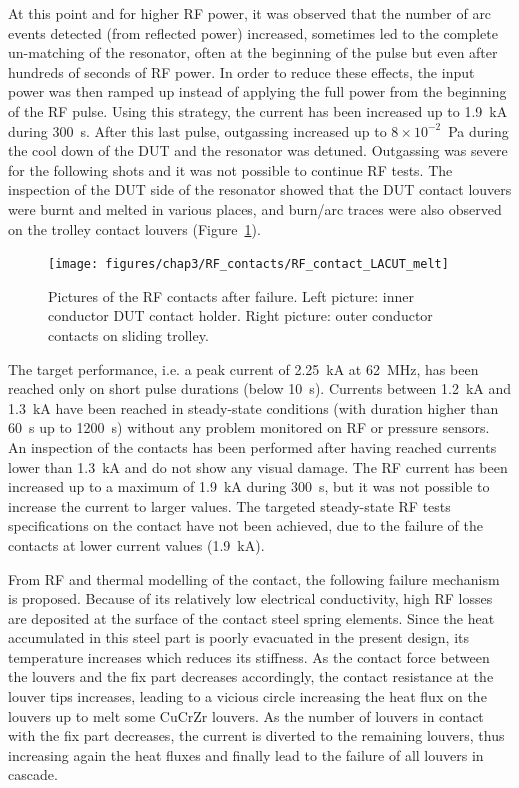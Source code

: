 {At this point and for higher RF power, it was observed that the number of arc events detected (from reflected power) increased, sometimes led to the complete un-matching of the resonator, often at the beginning of the pulse but even after hundreds of seconds of RF power. In order to reduce these effects, the input power was then ramped up instead of applying the full power from the beginning of the RF pulse. Using this strategy, the current has been increased up to 1.9~kA during 300~s. After this last pulse, outgassing increased up to $8\times 10^{-2}$~Pa during the cool down of the DUT and the resonator was detuned. Outgassing was severe for the following shots and it was not possible to continue RF tests. The inspection of the DUT side of the resonator showed that the DUT contact louvers were burnt and melted in various places, and burn/arc traces were also observed on the trolley contact louvers (Figure~\ref{fig:rfcontactlacutmelt}). 


\begin{figure}[h]
	\centering
	\texttt{[image: figures/chap3/RF\_contacts/RF\_contact\_LACUT\_melt]}
	\caption{Pictures of the RF contacts after failure. Left picture: inner conductor DUT contact holder. Right picture: outer conductor contacts on sliding trolley.}
	\label{fig:rfcontactlacutmelt}
\end{figure}

The target performance, i.e. a peak current of 2.25~kA at 62~MHz, has been reached only on short pulse durations (below 10~s). Currents between 1.2~kA and 1.3~kA have been reached in steady-state conditions (with duration higher than 60~s up to 1200~s) without any problem monitored on RF or pressure sensors. An inspection of the contacts has been performed after having reached currents lower than 1.3~kA and do not show any visual damage. The RF current has been increased up to a maximum of 1.9~kA during 300~s, but it was not possible to increase the current to larger values. The targeted steady-state RF tests specifications on the contact have not been achieved, due to the failure of the contacts at lower current values (1.9~kA). 

From RF and thermal modelling of the contact, the following failure mechanism is proposed. Because of its relatively low electrical conductivity, high RF losses are deposited at the surface of the contact steel spring elements. Since the heat accumulated in this steel part is poorly evacuated in the present design, its temperature increases which reduces its stiffness. As the contact force between the louvers and the fix part decreases accordingly, the contact resistance at the louver tips increases, leading to a vicious circle increasing the heat flux on the louvers up to melt some CuCrZr louvers. As the number of louvers in contact with the fix part decreases, the current is diverted to the remaining louvers, thus increasing again the heat fluxes and finally lead to the failure of all louvers in cascade. 



}
